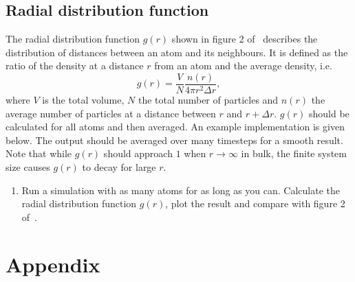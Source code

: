 \documentclass[11pt,british,a4paper]{report}
\renewcommand{\thesubsection}{\arabic{section}\alph{subsection})}
\begin{document}
\subsection{Radial distribution function}
The radial distribution function \(g(r)\) shown in figure 2 of~\cite{Rahman_1964} describes the distribution of distances between an atom and its neighbours. It is defined as the ratio of the density at a distance \(r\) from an atom and the average density, i.e.
\begin{equation}
    g(r) = \frac{V}{N} \frac{n(r)}{4\pi r^2\Delta r},\label{eq:rdf}
\end{equation}
where \(V\) is the total volume, \(N\) the total number of particles and \(n(r)\) the average number of particles at a distance between \(r\) and \(r+\Delta r\). \(g(r)\) should be calculated for all atoms and then averaged. An example implementation is given below. The output should be averaged over many timesteps for a smooth result. Note that while \(g(r)\) should approach \(1\) when \(r\to\infty\) in bulk, the finite system size causes \(g(r)\) to decay for large \(r\).
\begin{enumerate}[label=\roman*.]
    \item Run  a simulation with as many atoms for as long as you can. Calculate the radial distribution function \(g(r)\), plot the result and compare with figure 2 of~\cite{Rahman_1964}.
\end{enumerate}









\clearpage
\appendix
\section*{Appendix}
\setcounter{subsection}{0}
\renewcommand{\thesubsection}{\Alph{subsection}}

\end{document}
